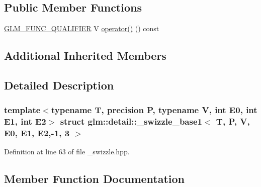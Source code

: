 \subsection*{Public Member Functions}
\begin{DoxyCompactItemize}
\item 
\hyperlink{setup_8hpp_a33fdea6f91c5f834105f7415e2a64407}{G\+L\+M\+\_\+\+F\+U\+N\+C\+\_\+\+Q\+U\+A\+L\+I\+F\+I\+ER} V \hyperlink{structglm_1_1detail_1_1__swizzle__base1_3_01_t_00_01_p_00_01_v_00_01_e0_00_01_e1_00_01_e2_00-1_00_013_01_4_aa26e2b6111d5b2c635dac60cbda9f0c8}{operator()} () const
\end{DoxyCompactItemize}
\subsection*{Additional Inherited Members}


\subsection{Detailed Description}
\subsubsection*{template$<$typename T, precision P, typename V, int E0, int E1, int E2$>$\newline
struct glm\+::detail\+::\+\_\+swizzle\+\_\+base1$<$ T, P, V, E0, E1, E2,-\/1, 3 $>$}



Definition at line 63 of file \+\_\+swizzle.\+hpp.



\subsection{Member Function Documentation}
\mbox{\label{structglm_1_1detail_1_1__swizzle__base1_3_01_t_00_01_p_00_01_v_00_01_e0_00_01_e1_00_01_e2_00-1_00_013_01_4_aa26e2b6111d5b2c635dac60cbda9f0c8}} 
